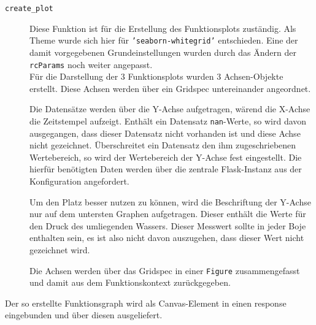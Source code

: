 \begin{description}
 \item [\texttt{create\_plot}]
    Diese Funktion ist für die Erstellung des Funktionsplots zuständig. Als Theme wurde sich hier für \texttt{'seaborn-whitegrid'} entschieden. Eine der damit vorgegebenen Grundeinstellungen wurden durch das Ändern der \texttt{rcParams} noch weiter angepasst.\\
    Für die Darstellung der 3 Funktionsplots wurden 3 Achsen-Objekte erstellt. Diese Achsen werden über ein Gridspec untereinander angeordnet. 
    
    Die Datensätze werden über die Y-Achse aufgetragen, wärend die X-Achse die Zeitstempel aufzeigt. Enthält ein Datensatz \texttt{nan}-Werte, so wird davon ausgegangen, dass dieser Datensatz nicht vorhanden ist und diese Achse nicht gezeichnet. Überschreitet ein Datensatz den ihm zugeschriebenen Wertebereich, so wird der Wertebereich der Y-Achse fest eingestellt. Die hierfür benötigten Daten werden über die zentrale Flask-Instanz aus der Konfiguration angefordert.
    
    Um den Platz besser nutzen zu können, wird die Beschriftung der Y-Achse nur auf dem untersten Graphen aufgetragen. Dieser enthält die Werte für den Druck des umliegenden Wassers. Dieser Messwert sollte in jeder Boje enthalten sein, es ist also nicht davon auszugehen, dass dieser Wert nicht gezeichnet wird. 
    
    Die Achsen werden über das Gridspec in einer \texttt{Figure} zusammengefasst und damit aus dem Funktionskontext zurückgegeben. 
\end{description}

Der so erstellte Funktionsgraph wird als Canvas-Element in einen response eingebunden und über diesen ausgeliefert.




    




